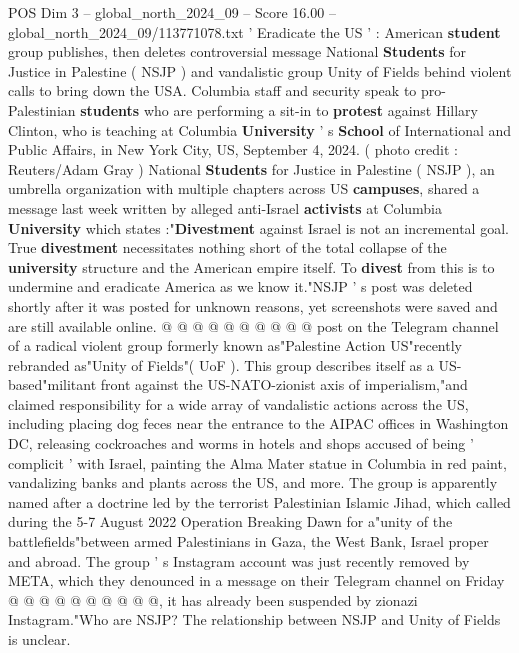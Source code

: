 \begin{textsample}{POS Dim 3 – global\_north\_2024\_09 – Score 16.00 – global\_north\_2024\_09/113771078.txt}  \label{ex:f3_pos_165}
' Eradicate the US ' : American \textbf{student} group publishes, then deletes controversial message National \textbf{Students} for Justice in Palestine ( NSJP ) and vandalistic group Unity of Fields behind violent calls to bring down the USA.
Columbia staff and security speak to pro-Palestinian \textbf{students} who are performing a sit-in to \textbf{protest} against Hillary Clinton, who is teaching at Columbia \textbf{University} ' s \textbf{School} of International and Public Affairs, in New York City, US, September 4, 2024. ( photo credit : Reuters/Adam Gray ) National \textbf{Students} for Justice in Palestine ( NSJP ), an umbrella organization with multiple chapters across US \textbf{campuses}, shared a message last week written by alleged anti-Israel \textbf{activists} at Columbia \textbf{University} which states :"\textbf{Divestment} against Israel is not an incremental goal.
True \textbf{divestment} necessitates nothing short of the total collapse of the \textbf{university} structure and the American empire itself.
To \textbf{divest} from this is to undermine and eradicate America as we know it."NSJP ' s post was deleted shortly after it was posted for unknown reasons, yet screenshots were saved and are still available online. @ @ @ @ @ @ @ @ @ @ post on the Telegram channel of a radical violent group formerly known as"Palestine Action US"recently rebranded as"Unity of Fields"( UoF ).
This group describes itself as a US-based"militant front against the US-NATO-zionist axis of imperialism,"and claimed responsibility for a wide array of vandalistic actions across the US, including placing dog feces near the entrance to the AIPAC offices in Washington DC, releasing cockroaches and worms in hotels and shops accused of being ' complicit ' with Israel, painting the Alma Mater statue in Columbia in red paint, vandalizing banks and plants across the US, and more.
The group is apparently named after a doctrine led by the terrorist Palestinian Islamic Jihad, which called during the 5-7 August 2022 Operation Breaking Dawn for a"unity of the battlefields"between armed Palestinians in Gaza, the West Bank, Israel proper and abroad.
The group ' s Instagram account was just recently removed by META, which they denounced in a message on their Telegram channel on Friday @ @ @ @ @ @ @ @ @ @, it has already been suspended by zionazi Instagram."Who are NSJP?
The relationship between NSJP and Unity of Fields is unclear.

\end{textsample}
